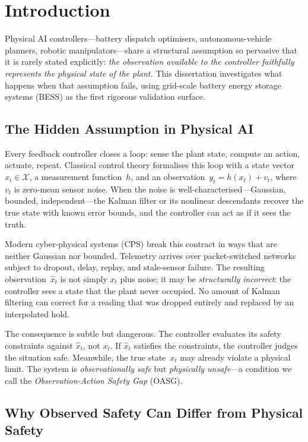 
\chapter{Introduction}
\label{ch:introduction}

Physical AI controllers---battery dispatch optimisers, autonomous-vehicle
planners, robotic manipulators---share a structural assumption so pervasive
that it is rarely stated explicitly: \emph{the observation available to the
controller faithfully represents the physical state of the plant.}  This
dissertation investigates what happens when that assumption fails, using
grid-scale battery energy storage systems (BESS) as the first rigorous
validation surface.

\section{The Hidden Assumption in Physical AI}

Every feedback controller closes a loop: sense the plant state, compute an
action, actuate, repeat.  Classical control theory formalises this loop with
a state vector~$x_t \in \mathcal{X}$, a measurement function~$h$, and an
observation~$y_t = h(x_t) + v_t$, where $v_t$ is zero-mean sensor noise.
When the noise is well-characterised---Gaussian, bounded, independent---the
Kalman filter or its nonlinear descendants recover the true state with known
error bounds, and the controller can act as if it sees the truth.

Modern cyber-physical systems (CPS) break this contract in ways that are
neither Gaussian nor bounded.  Telemetry arrives over packet-switched
networks subject to dropout, delay, replay, and stale-sensor failure.
The resulting observation~$\hat{x}_t$ is not simply $x_t$ plus noise;
it may be \emph{structurally incorrect}: the controller sees a state that
the plant never occupied.  No amount of Kalman filtering can correct for a
reading that was dropped entirely and replaced by an interpolated hold.

The consequence is subtle but dangerous.  The controller evaluates its
safety constraints against $\hat{x}_t$, not $x_t$.  If $\hat{x}_t$
satisfies the constraints, the controller judges the situation safe.
Meanwhile, the true state~$x_t$ may already violate a physical limit.
The system is \emph{observationally safe} but \emph{physically unsafe}---a
condition we call the \emph{Observation-Action Safety Gap} (OASG).

\section{Why Observed Safety Can Differ from Physical Safety}

